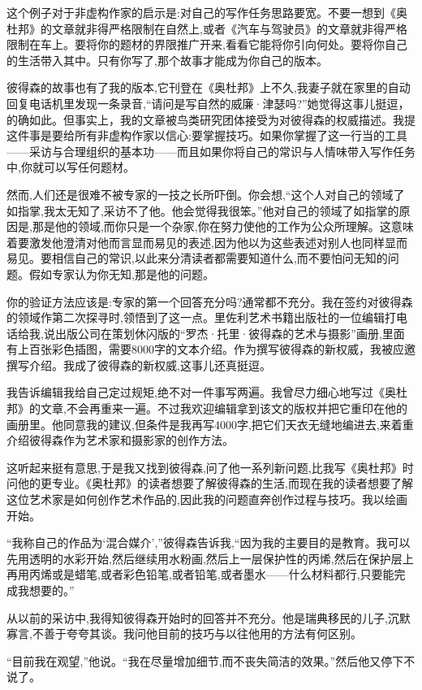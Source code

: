 这个例子对于非虚构作家的启示是:对自己的写作任务思路要宽。不要一想到《奥杜邦》的文章就非得严格限制在自然上,或者《汽车与驾驶员》的文章就非得严格限制在车上。要将你的题材的界限推广开来,看看它能将你引向何处。要将你自己的生活带入其中。只有你写了,那个故事才能成为你自己的版本。

彼得森的故事也有了我的版本,它刊登在《奥杜邦》上不久,我妻子就在家里的自动回复电话机里发现一条录音,“请问是写自然的威廉·津瑟吗?”她觉得这事儿挺逗，的确如此。但事实上，我的文章被鸟类研究团体接受为对彼得森的权威描述。我提这件事是要给所有非虚构作家以信心:要掌握技巧。如果你掌握了这一行当的工具——采访与合理组织的基本功——而且如果你将自己的常识与人情味带入写作任务中,你就可以写任何题材。

然而,人们还是很难不被专家的一技之长所吓倒。你会想,“这个人对自己的领域了如指掌,我太无知了,采访不了他。他会觉得我很笨。”他对自己的领域了如指掌的原因是,那是他的领域,而你只是一个杂家,你在努力使他的工作为公众所理解。这意味着要激发他澄清对他而言显而易见的表述,因为他以为这些表述对别人也同样显而易见。要相信自己的常识,以此来分清读者都需要知道什么,而不要怕问无知的问题。假如专家认为你无知,那是他的问题。

你的验证方法应该是:专家的第一个回答充分吗?通常都不充分。我在签约对彼得森的领域作第二次探寻时,领悟到了这一点。里佐利艺术书籍出版社的一位编辑打电话给我,说出版公司在策划休闪版的“罗杰·托里·彼得森的艺术与摄影”画册,里面有上百张彩色插图，需要8000字的文本介绍。作为撰写彼得森的新权威，我被应邀撰写介绍。我成了彼得森的新权威,这事儿还真挺逗。


我告诉编辑我给自己定过规矩,绝不对一件事写两遍。我曾尽力细心地写过《奥杜邦》的文章,不会再重来一遍。不过我欢迎编辑拿到该文的版权并把它重印在他的画册里。他同意我的建议,但条件是我再写4000字,把它们天衣无缝地编进去,来着重介绍彼得森作为艺术家和摄影家的创作方法。

这听起来挺有意思,于是我又找到彼得森,问了他一系列新问题,比我写《奥杜邦》时问他的更专业。《奥杜邦》的读者想要了解彼得森的生活,而现在我的读者想要了解这位艺术家是如何创作艺术作品的,因此我的问题直奔创作过程与技巧。我以绘画开始。

“我称自己的作品为‘混合媒介’,”彼得森告诉我,“因为我的主要目的是教育。我可以先用透明的水彩开始,然后继续用水粉画,然后上一层保护性的丙烯,然后在保护层上再用丙烯或是蜡笔,或者彩色铅笔,或者铅笔,或者墨水——什么材料都行,只要能完成我想要的。”

从以前的采访中,我得知彼得森开始时的回答并不充分。他是瑞典移民的儿子,沉默寡言,不善于夸夸其谈。我问他目前的技巧与以往他用的方法有何区别。

“目前我在观望,”他说。“我在尽量增加细节,而不丧失简洁的效果。”然后他又停下不说了。

